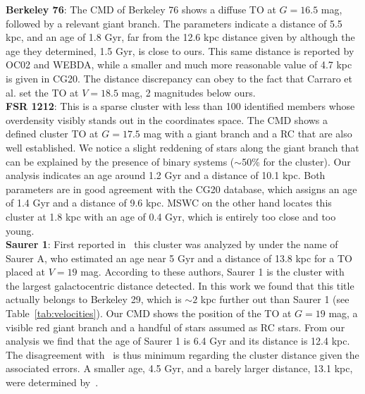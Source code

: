 \documentclass{aa}
\begin{document}
  \textbf{Berkeley 76}: The CMD of Berkeley 76 shows a diffuse TO at $G=16.5$
  mag, followed by a relevant giant branch. The parameters indicate a distance
  of 5.5 kpc, and an age of 1.8 Gyr, far from the 12.6 kpc distance given
  by \cite{Carraro_2013_Five} although the age they determined, 1.5 Gyr, is
  close to ours. This same distance is reported by OC02 and WEBDA, while a
  smaller and much more reasonable value of 4.7 kpc is given in CG20.
  The distance discrepancy can obey to the fact that Carraro et al. set
  the TO at $V=18.5$ mag, 2 magnitudes below ours.\\

  \textbf{FSR 1212}: This is a sparse cluster with less than 100 identified 
  members whose overdensity visibly stands out in the coordinates space. The CMD
  shows a defined cluster TO at $G=17.5$ mag with a giant branch and a RC that
  are also well established. We notice a slight reddening of stars along the
  giant branch that can be explained by the presence of binary systems 
  ($\sim$50\% for the cluster).
  Our analysis indicates an age around 1.2 Gyr and a distance of 10.1
  kpc. Both parameters are in good agreement with the CG20 database, which
  assigns an age of 1.4 Gyr and a distance of 9.6 kpc. MSWC on the other hand
  locates this cluster at 1.8 kpc with an age of 0.4 Gyr, which is entirely too
  close and too young.\\

  \textbf{Saurer 1}: First reported in~\citet[][along with Saurer 3 and Saurer 6]
  {Saurer_1994} this cluster was analyzed by \cite{Carraro_2003} under
  the name of Saurer A, who estimated an age near 5 Gyr and a distance of 13.8
  kpc for a TO placed at $V=19$ mag. According to these authors, Saurer 1 is the
  cluster with the largest galactocentric distance detected. In this work we
  found that this title actually belongs to Berkeley 29, which is $\sim2$
  kpc further out than Saurer 1 (see Table~\ref{tab:velocities}).
  Our CMD shows the position of the TO at $G=19$ mag, a visible red giant
  branch and a handful of stars assumed as RC stars. From our analysis we find
  that the age of Saurer 1 is 6.4 Gyr and its distance is 12.4 kpc. The
  disagreement with~\cite{Carraro_2003} is thus minimum regarding the
  cluster distance given the associated errors. A smaller age, 4.5 Gyr, and
  a barely larger distance, 13.1 kpc, were determined
  by~\cite{Frinchaboy_2006}.\\
\end{document}
